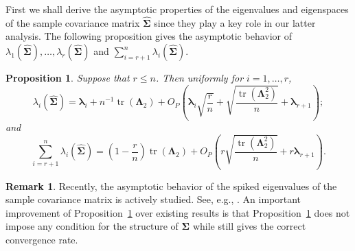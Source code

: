 \documentclass[12pt]{article} %
\DeclareMathOperator{\mytr}{tr}
\newcommand{\bZ}{\mathbf{Z}}
\newcommand{\bfsym}[1]{\ensuremath{\boldsymbol{#1}}}
\def\blambda {\bfsym {\lambda}}
\def\bLambda {\bfsym {\Lambda}}
\def\bSigma {\bfsym {\Sigma}}
\newtheorem{proposition}{Proposition}
\theoremstyle{definition}
\newtheorem{remark}{Remark}
\begin{document}
First we shall derive the asymptotic properties of the eigenvalues and eigenspaces of the sample covariance matrix $\hat{\bSigma}$ since they play a key role in our latter analysis.
    The following proposition gives the asymptotic behavior of $\lambda_1(\hat{\bSigma}),\ldots, \lambda_r(\hat{\bSigma})$ and $\sum_{i=r+1}^n\lambda_i(\hat{\bSigma})$.
\begin{proposition}
    \label{eigenvalueProp}
    Suppose that $r\leq n$.
    Then uniformly for $i=1,\ldots, r$, 
\begin{equation*}
    \lambda_i(\hat{\bSigma})
        =
        \blambda_i
        +
        n^{-1}\mytr(\bLambda_2)
        +O_P\left(\blambda_i \sqrt{\frac{r}{n}}+\sqrt{\frac{\mytr(\bLambda_2^2)}{ n}}+\blambda_{r+1}\right);
    \end{equation*}
        and
\begin{equation*}
     \sum_{i=r+1}^n\lambda_i(\hat{\bSigma})
    =
    \left(1-\frac{r}{n}\right)\mytr(\bLambda_2)
    +O_P\left(r\sqrt{\frac{\mytr(\bLambda_2^2)}{ n}}+r\blambda_{r+1}\right)
    .
\end{equation*}
\end{proposition}

\begin{remark}
    Recently, the asymptotic behavior of the spiked eigenvalues of the sample covariance matrix is actively studied.
    See, e.g., \cite{Yata2013PCA,Shen2016A,wang2017As,Cai2017Limiting}.
    An important improvement of Proposition~\ref{eigenvalueProp} over existing results is that Proposition~\ref{eigenvalueProp} does not impose any condition for the structure of $\bSigma$ while still gives the correct convergence rate.
\end{remark}
\end{document}
